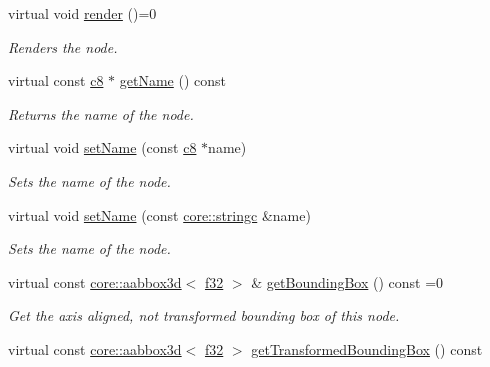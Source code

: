 \begin{DoxyCompactItemize}
\mbox{\label{classirr_1_1scene_1_1ISceneNode_aff530cc4856792101d0aedee51ce35fa}} 
virtual void \hyperlink{classirr_1_1scene_1_1ISceneNode_aff530cc4856792101d0aedee51ce35fa}{render} ()=0
\begin{DoxyCompactList}\small\item\em Renders the node. \end{DoxyCompactList}\item 
virtual const \hyperlink{namespaceirr_a9395eaea339bcb546b319e9c96bf7410}{c8} $\ast$ \hyperlink{classirr_1_1scene_1_1ISceneNode_ab0e72b38949f926a1929468cd2b1ce16}{get\+Name} () const
\begin{DoxyCompactList}\small\item\em Returns the name of the node. \end{DoxyCompactList}\item 
virtual void \hyperlink{classirr_1_1scene_1_1ISceneNode_a810a54a2fc178b9a0e731513865f67d0}{set\+Name} (const \hyperlink{namespaceirr_a9395eaea339bcb546b319e9c96bf7410}{c8} $\ast$name)
\begin{DoxyCompactList}\small\item\em Sets the name of the node. \end{DoxyCompactList}\item 
virtual void \hyperlink{classirr_1_1scene_1_1ISceneNode_a20a22d956974f4817a20663361f20042}{set\+Name} (const \hyperlink{namespaceirr_1_1core_ab26a0e0359206b5a694f35c37c829d7f}{core\+::stringc} \&name)
\begin{DoxyCompactList}\small\item\em Sets the name of the node. \end{DoxyCompactList}\item 
virtual const \hyperlink{classirr_1_1core_1_1aabbox3d}{core\+::aabbox3d}$<$ \hyperlink{namespaceirr_a0277be98d67dc26ff93b1a6a1d086b07}{f32} $>$ \& \hyperlink{classirr_1_1scene_1_1ISceneNode_a223f718fc2f4944b5ad28c592f6cc8c6}{get\+Bounding\+Box} () const =0
\begin{DoxyCompactList}\small\item\em Get the axis aligned, not transformed bounding box of this node. \end{DoxyCompactList}\item 
virtual const \hyperlink{classirr_1_1core_1_1aabbox3d}{core\+::aabbox3d}$<$ \hyperlink{namespaceirr_a0277be98d67dc26ff93b1a6a1d086b07}{f32} $>$ \hyperlink{classirr_1_1scene_1_1ISceneNode_a77746edcc479107067fbf1f4471ab412}{get\+Transformed\+Bounding\+Box} () const

\end{DoxyCompactItemize}
